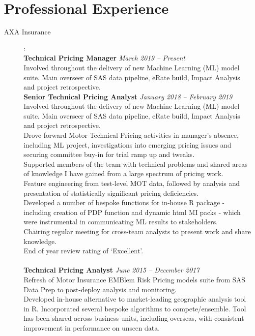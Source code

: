 \documentclass[11pt]{article}
\begin{document}
\section*{Professional Experience}
\begin{description}

\item[AXA Insurance]: \\
\textbf{Technical Pricing Manager} \emph{March 2019 -- Present}\\
\textbullet \quad Involved throughout the delivery of new Machine Learning (ML) model suite. Main overseer of SAS data pipeline, eRate build, Impact Analysis and project retrospective. \\
\textbf{Senior Technical Pricing Analyst} \emph{January 2018 -- February 2019}\\
\textbullet \quad Involved throughout the delivery of new Machine Learning (ML) model suite. Main overseer of SAS data pipeline, eRate build, Impact Analysis and project retrospective. \\
\textbullet \quad Drove forward Motor Technical Pricing activities in manager's absence, including ML project, investigations into emerging pricing issues and securing committee buy-in for trial ramp up and tweaks. \\
\textbullet \quad Supported members of the team with technical problems and shared areas of knowledge I have gained from a large spectrum of pricing work. \\
\textbullet \quad Feature engineering from test-level MOT data, followed by analysis and presentation of statistically significant pricing deficiencies. \\
\textbullet \quad Developed a number of bespoke functions for in-house R package - including creation of PDP function and dynamic html MI packs - which were instrumental in communicating ML results to stakeholders. \\
\textbullet \quad Chairing regular meeting for cross-team analysts to present work and share knowledge. \\
\textbullet \quad End of year review rating of `Excellent'.
\\\\
\textbf{Technical Pricing Analyst} \emph{June 2015 -- December 2017}\\
\textbullet \quad Refresh of Motor Insurance EMBlem Risk Pricing models suite from SAS Data Prep to post-deploy analysis and monitoring. \\
\textbullet \quad Developed in-house alternative to market-leading geographic analysis tool in R. Incorporated several bespoke algorithms to compete/ensemble. Tool has been shared across business units, including overseas, with consistent improvement in performance on unseen data. \\

\end{description}
\end{document}
